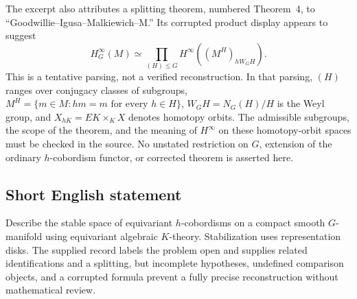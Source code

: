 \documentclass[11pt]{article}
\begin{document}
The excerpt also attributes a splitting theorem, numbered Theorem~4, to ``Goodwillie--Igusa--Malkiewich--M.'' Its corrupted product display appears to suggest
\[
 H_G^\infty(M)\simeq
 \prod_{(H)\leq G}
 H^\infty\!\left((M^H)_{hW_GH}\right).
\]
This is a tentative parsing, not a verified reconstruction. In that parsing, \((H)\) ranges over conjugacy classes of subgroups, \(M^H=\{m\in M:hm=m\text{ for every }h\in H\}\), \(W_GH=N_G(H)/H\) is the Weyl group, and \(X_{hK}=EK\times_K X\) denotes homotopy orbits. The admissible subgroups, the scope of the theorem, and the meaning of \(H^\infty\) on these homotopy-orbit spaces must be checked in the source. No unstated restriction on \(G\), extension of the ordinary \(h\)-cobordism functor, or corrected theorem is asserted here.
\subsection{Short English statement}
Describe the stable space of equivariant \(h\)-cobordisms on a compact smooth \(G\)-manifold using equivariant algebraic \(K\)-theory. Stabilization uses representation disks. The supplied record labels the problem open and supplies related identifications and a splitting, but incomplete hypotheses, undefined comparison objects, and a corrupted formula prevent a fully precise reconstruction without mathematical review.
\end{document}
